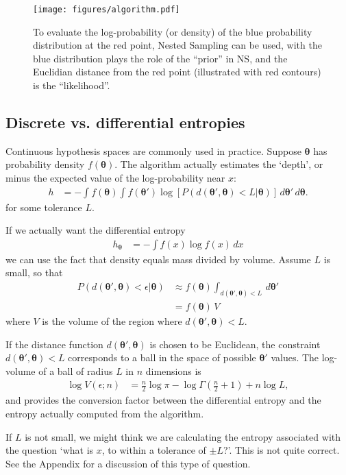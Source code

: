 \documentclass[entropy,article,accept,oneauthor,pdftex,10pt,a4paper]{mdpi}
\newcommand{\x}{\boldsymbol{\theta}}
\begin{document}
\begin{figure}[!ht]
\centering
\texttt{[image: figures/algorithm.pdf]}
\caption{To evaluate the log-probability (or density) of the blue
probability distribution at the red point, Nested Sampling can be used,
with the blue distribution plays the role of the ``prior'' in NS, and the
Euclidian distance from the red point (illustrated with red contours)
is the ``likelihood''.\label{fig:algorithm}}
\end{figure}

\subsection{Discrete vs. differential entropies}

Continuous hypothesis spaces are commonly used in practice. Suppose
$\x$ has probability density $f(\x)$. The algorithm actually estimates
the `depth', or minus the expected value of the log-probability near $x$:
\begin{align}
h &= -\int f(\x) \int f(\x')
            \log \left[ P(d(\x', \x) < L | \x) \right]
                        \, d\x' \, d\x.
\end{align}
for some tolerance $L$.

If we actually want the differential
entropy
\begin{align}
h_{\x} &= -\int f(x) \log f(x) \, dx
\end{align}
we can use the fact that density equals mass divided
by volume. Assume $L$ is small, so that
\begin{align}
P(d(\x', \x) < \epsilon | \x)
    &\approx
    f(\x) \int_{d(\x', \x) < L} \, d\x'\\
    &= f(\x) \, V
\end{align}
where $V$ is the volume of the region where $d(\x', \x) < L$.

If the distance function $d(\x', \x)$ is chosen to be Euclidean,
the constraint $d(\x', \x) < L$ corresponds to a ball in the space
of possible $\x'$ values.
The log-volume of a ball of radius $L$ in $n$ dimensions is
\begin{align}
\log V(\epsilon; n) &= \frac{n}{2}\log \pi
                        - \log \Gamma\left(\frac{n}{2} + 1\right)
                        + n \log L,
\end{align}
and provides the conversion factor between the differential entropy and
the entropy actually computed from the algorithm.

If $L$ is not small, we might think we are calculating the entropy associated
with the question `what is $x$, to within a tolerance of $\pm L$?'.
This is not quite correct. See the Appendix for a discussion of this
type of question.
\end{document}
